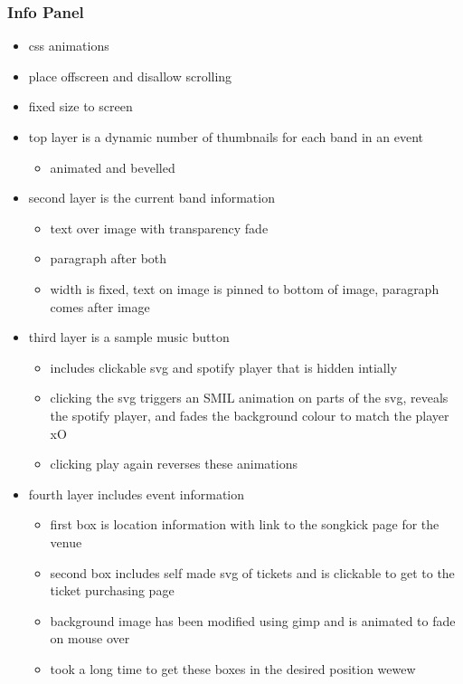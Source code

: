 \documentclass[10pt]{article}
\begin{document}
            \subsubsection{Info Panel}
                \begin{itemize}
                    \item css animations
                    \item place offscreen and disallow scrolling
                    \item fixed size to screen

                    \item top layer is a dynamic number of thumbnails for each band in an event
                        \begin{itemize}
                            \item animated and bevelled
                        \end{itemize}
                    \item second layer is the current band information
                        \begin{itemize}
                            \item text over image with transparency fade
                            \item paragraph after both
                            \item width is fixed, text on image is pinned to bottom of image, paragraph comes after image
                        \end{itemize}
                    \item third layer is a sample music button
                        \begin{itemize}
                            \item includes clickable svg and spotify player that is hidden intially
                            \item clicking the svg triggers an SMIL animation on parts of the svg, reveals the spotify player, and fades the background colour to match the player xO
                            \item clicking play again reverses these animations
                        \end{itemize}

                    \item fourth layer includes event information
                        \begin{itemize}
                            \item first box is location information with link to the songkick page for the venue
                            \item second box includes self made svg of tickets and is clickable to get to the ticket purchasing page
                            \item background image has been modified using gimp and is animated to fade on mouse over
                            \item took a long time to get these boxes in the desired position wewew
                        \end{itemize}
                \end{itemize}
\end{document}

